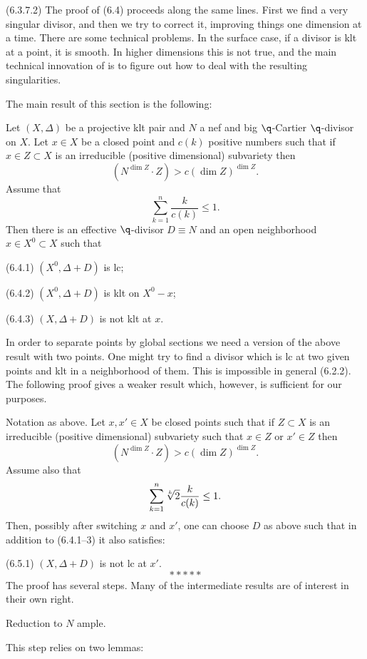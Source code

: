(6.3.7.2) The proof of (6.4) proceeds along the same lines.
First we find a very singular divisor, and then we try to correct it, improving
things one dimension at a time. There are some technical problems. In the
surface case, if a divisor is klt at a point, it is smooth. In higher
dimensions this is not true, and the main technical innovation of
\cite{Angehrn-Siu95} is to figure out how to deal with the resulting
singularities.
\enddemo

The main  result of this section is the following:



 Let $(X,\Delta)$ be a projective klt pair and  $N$ 
a nef and big $\q$-Cartier $\q$-divisor on $X$. Let $x\in X$ be  a closed
point and $c(k)$ positive numbers such that   if
$x\in  Z\subset X$  is an irreducible (positive dimensional) subvariety  then 
$$
(N^{\dim Z}\cdot Z)>c(\dim Z)^{\dim Z}.
$$ 
 Assume that 
$$
\sum_{k=1}^n \frac{k}{c(k)}\leq 1.
$$
Then there is an effective $\q$-divisor $D\equiv N$ and an open
neighborhood $x\in X^0\subset X$ such that

(6.4.1) $(X^0,\Delta+D)$ is lc;

(6.4.2) $(X^0,\Delta+D)$ is klt on $X^0-x$;

(6.4.3) $(X,\Delta+D)$ is not klt at $x$.
\endproclaim


In order to separate points  by global sections we need a version of the
above result with two points. One might try to find a divisor
which is lc at two given points and klt in a neighborhood of them. 
This is impossible in general (6.2.2). The following
proof gives  a  weaker result which, however, is sufficient for our
purposes.


 Notation as above.  Let $x,x'\in X$ be  closed
points  such that   if
$ Z\subset X$  is an irreducible (positive dimensional) subvariety such that
$x\in Z$  or $x'\in Z$ then 
$$
(N^{\dim Z}\cdot Z)>c(\dim Z)^{\dim Z}.
$$ 
 Assume also  that 
$$
\sum_{k=1}^n \root{k}\of{2}\frac{k}{c(k)}\leq 1.
$$
Then, possibly after switching $x$ and $x'$,  one can choose
$D$ as above such that in addition to (6.4.1--3) it also satisfies:

(6.5.1)  $(X,\Delta+D)$ is not lc at $x'$.
\endproclaim
$$
*****
$$
\demop  The proof has several steps. Many of the intermediate results
are of interest in their own right.
\demop

  Reduction to  $N$  ample. 

This step relies on two lemmas:

